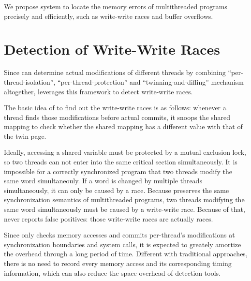 We propose \stopgap{} system to locate the memory errors of 
multithreaded programs precisely and efficiently, such as write-write races and buffer overflows. 

\section{Detection of Write-Write Races}

Since \Sheriff{} can determine actual 
modifications of different threads by combining
``per-thread-isolation'', ``per-thread-protection'' and ``twinning-and-diffing'' mechanism
altogether, \stopgap{} leverages this framework to detect write-write races.
 
The basic idea of \stopgap{} to find out the write-write races is as follows: 
whenever a thread finds those modifications before actual commits, 
it snoops the shared mapping to check whether the shared mapping has a different value 
with that of the twin page.

Ideally, accessing a shared variable must be protected by a mutual exclusion lock, 
so two threads can not enter into the same critical section simultaneously.
It is impossible for a correctly synchronized program that two threads modify 
the same word simultaneouly.  
If a word is changed by multiple threads simultaneously, it can only be caused by a race.
Because \stopgap{} preserves the same synchronization semantics of multithreaded programs, 
two threads modifying the same word simultaneously must be caused by a write-write race.
Because of that, \stopgap{}  never reports false 
positives: those write-write races are actually races. 

Since \stopgap{} only checks memory accesses and commits per-thread's modifications 
at synchronization 
boundaries and system calls, it is expected to greately amortize the overhead 
through a long period of time. 
Different with traditional approaches, there is no need to record every memory access and its 
corresponding timing information, which can also reduce the space overhead of detection tools. 

